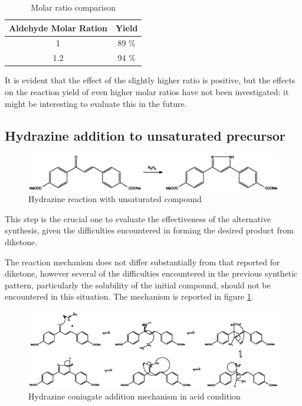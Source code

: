 \documentclass[../Master.tex]{subfiles}
\begin{document}
\begin{table}[h!]
	\centering
	\begin{tabular}[b]{cc}
		\toprule
		Aldehyde Molar Ration & Yield \\
		\midrule
		1                     & 89 \% \\
		1.2                   & 94 \% \\
		\bottomrule
	\end{tabular}
	\caption{Molar ratio comparison}\label{tab:hydrazine-ratio}
\end{table}

It is evident that the effect of the slightly higher ratio is positive, but the effects on the reaction yield of even higher molar ratios have not been investigated: it might be interesting to evaluate this in the future.

\subsection{Hydrazine addition to unsaturated precursor}\label{sec:hyd-add-ins}

\begin{figure}[h!]
	\centering
	\includegraphics[width=13cm,keepaspectratio]{Structures/pyrazole-form-alternative.eps}
	\caption{Hydrazine reaction with unsaturated compound}
\end{figure}

This step is the crucial one to evaluate the effectiveness of the alternative synthesis, given the difficulties encountered in forming the desired product from diketone.

The reaction mechanism does not differ substantially from that reported for diketone, however several of the difficulties encountered in the previous synthetic pattern, particularly the solubility of the initial compound, should not be encountered in this situation. The mechanism is reported in figure \ref{fig:unsmecha}.
\begin{figure}[h!]
	\centering
	\includegraphics[width=16cm,keepaspectratio]{Structures/unsmecha.eps}
	\caption{Hydrazine coniugate addition mechanism in acid condition}\label{fig:unsmecha}
\end{figure}
\newpage
\end{document}
